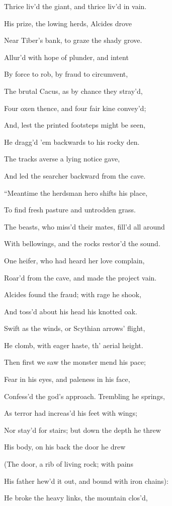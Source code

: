 Thrice liv’d the giant, and thrice liv’d in vain.

His prize, the lowing herds, Alcides drove

Near Tiber’s bank, to graze the shady grove.

Allur’d with hope of plunder, and intent

By force to rob, by fraud to circumvent,

The brutal Cacus, as by chance they stray’d,

Four oxen thence, and four fair kine convey’d;

And, lest the printed footsteps might be seen,

He dragg’d ’em backwards to his rocky den.

The tracks averse a lying notice gave,

And led the searcher backward from the cave.

“Meantime the herdsman hero shifts his place,

To find fresh pasture and untrodden grass.

The beasts, who miss’d their mates, fill’d all around

With bellowings, and the rocks restor’d the sound.

One heifer, who had heard her love complain,

Roar’d from the cave, and made the project vain.

Alcides found the fraud; with rage he shook,

And toss’d about his head his knotted oak.

Swift as the winds, or Scythian arrows’ flight,

He clomb, with eager haste, th’ aerial height.

Then first we saw the monster mend his pace;

Fear in his eyes, and paleness in his face,

Confess’d the god’s approach. Trembling he springs,

As terror had increas’d his feet with wings;

Nor stay’d for stairs; but down the depth he threw

His body, on his back the door he drew

(The door, a rib of living rock; with pains

His father hew’d it out, and bound with iron chains):

He broke the heavy links, the mountain clos’d,

